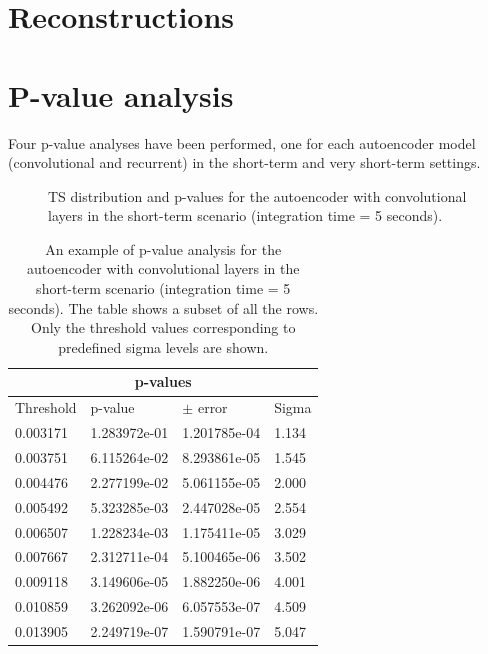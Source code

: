 \section{Reconstructions}
\label{s:appendix-reonstructions}


\section{P-value analysis}
\label{s:appendix-pvalue}

Four p-value analyses have been performed, one for each autoencoder model (convolutional and recurrent) in the short-term and very short-term settings.

\newpage

\begin{figure}[!h]
    \centering
    \begin{minipage}{0.5\textwidth}
        \centering
        
    \end{minipage}%
    \begin{minipage}{0.5\textwidth}
       \centering
       
    \end{minipage}
    \captionsetup{width=0.9\linewidth}
    \caption{TS distribution and p-values for the autoencoder with convolutional layers in the short-term scenario (integration time = 5 seconds).}
    \label{fig:ts-distribution-and-p-values-cnn-it-5-appendix}
\end{figure}

\begin{table}[!h]
\centering
\begin{tabular}{|p{3cm}|p{3cm}|p{3cm}|p{3cm}|}
\hline
\multicolumn{4}{|c|}{p-values} \\
\hline
Threshold & p-value & $\pm$ error &  Sigma \\
\hline
0.003171 & 1.283972e-01 & 1.201785e-04 & 1.134 \\
0.003751 & 6.115264e-02 & 8.293861e-05 & 1.545 \\
0.004476 & 2.277199e-02 & 5.061155e-05 & 2.000 \\
0.005492 & 5.323285e-03 & 2.447028e-05 & 2.554 \\
0.006507 & 1.228234e-03 & 1.175411e-05 & 3.029 \\
0.007667 & 2.312711e-04 & 5.100465e-06 & 3.502 \\
0.009118 & 3.149606e-05 & 1.882250e-06 & 4.001 \\
0.010859 & 3.262092e-06 & 6.057553e-07 & 4.509 \\
0.013905 & 2.249719e-07 & 1.590791e-07 & 5.047 \\
\hline
\end{tabular}
\caption{An example of p-value analysis for the autoencoder with convolutional layers in the short-term scenario (integration time = 5 seconds). The table shows a subset of all the rows. Only the threshold values corresponding to predefined sigma levels are shown.}
\label{tab:p-value-table-cnn-itime-5-appendix}
\end{table}




